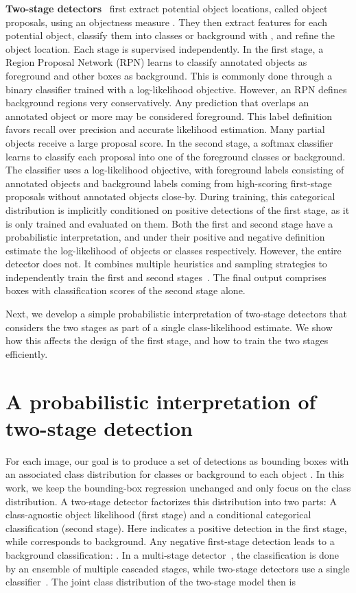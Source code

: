 \documentclass{article}
\begin{document}
\textbf{Two-stage detectors}~\cite{ren2015faster,cai2018cascade} first extract potential object locations, called object proposals, using an objectness measure .
They then extract features for each potential object, classify them into  classes or background  with , and refine the object location.
Each stage is supervised independently.
In the first stage, a Region Proposal Network (RPN) learns to classify annotated objects  as foreground and other boxes as background.
This is commonly done through a binary classifier trained with a log-likelihood objective.
However, an RPN defines background regions very conservatively.
Any prediction that overlaps an annotated object  or more may be considered foreground.
This label definition favors recall over precision and accurate likelihood estimation.
Many partial objects receive a large proposal score.
In the second stage, a softmax classifier learns to classify each proposal into one of the foreground classes or background.
The classifier uses a log-likelihood objective, with foreground labels consisting of annotated objects and background labels coming from high-scoring first-stage proposals without annotated objects close-by.
During training, this categorical distribution is implicitly conditioned on positive detections of the first stage, as it is only trained and evaluated on them.
Both the first and second stage have a probabilistic interpretation, and 
under their positive and negative definition 
estimate the log-likelihood of objects or classes respectively.
However, the entire detector does not.
It combines multiple heuristics and sampling strategies to independently train the first and second stages~\cite{cai2018cascade,ren2015faster}.
The final output comprises boxes with classification scores  of the second stage alone.

Next, we develop a simple probabilistic interpretation of two-stage detectors that considers the two stages as part of a single class-likelihood estimate.
We show how this affects the design of the first stage, and how to train the two stages efficiently.

\section{A probabilistic interpretation of two-stage detection}
For each image, our goal is to produce a set of  detections as bounding boxes  with an associated class distribution  for classes  or background to each object .
In this work, we keep the bounding-box regression unchanged and only focus on the class distribution.
A two-stage detector factorizes this distribution into two parts: A class-agnostic object likelihood  (first stage) and a conditional categorical classification  (second stage).
Here  indicates a positive detection in the first stage, while  corresponds to background.
Any negative first-stage detection  leads to a background  classification: .
In a multi-stage detector~\cite{cai2018cascade}, the classification is done by an ensemble of multiple cascaded stages, while two-stage detectors use a single classifier~\cite{ren2015faster}.
The joint class distribution of the two-stage model then is
\end{document}
